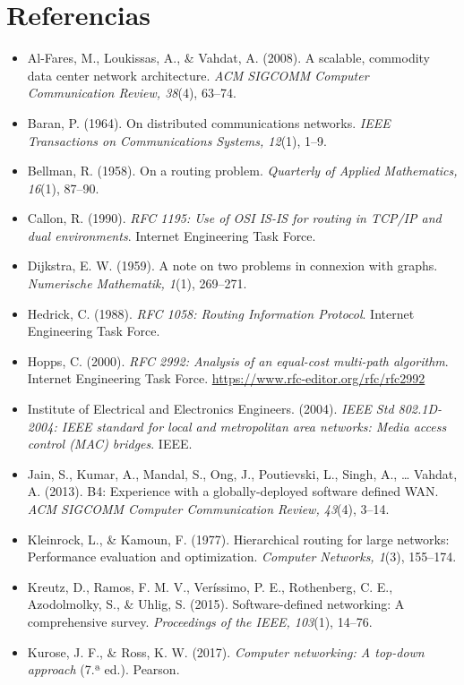 \documentclass[12pt,letterpaper]{article}
\begin{document}
\newpage
\section*{Referencias}
\begin{itemize}[leftmargin=1.5em,itemsep=7pt]
\item[] Al-Fares, M., Loukissas, A., \& Vahdat, A. (2008). A scalable, commodity data center network architecture. \emph{ACM SIGCOMM Computer Communication Review, 38}(4), 63--74.
\item[] Baran, P. (1964). On distributed communications networks. \emph{IEEE Transactions on Communications Systems, 12}(1), 1--9.
\item[] Bellman, R. (1958). On a routing problem. \emph{Quarterly of Applied Mathematics, 16}(1), 87--90.
\item[] Callon, R. (1990). \emph{RFC 1195: Use of OSI IS-IS for routing in TCP/IP and dual environments}. Internet Engineering Task Force.
\item[] Dijkstra, E. W. (1959). A note on two problems in connexion with graphs. \emph{Numerische Mathematik, 1}(1), 269--271.
\item[] Hedrick, C. (1988). \emph{RFC 1058: Routing Information Protocol}. Internet Engineering Task Force.
\item[] Hopps, C. (2000). \emph{RFC 2992: Analysis of an equal-cost multi-path algorithm}. Internet Engineering Task Force. \url{https://www.rfc-editor.org/rfc/rfc2992}
\item[] Institute of Electrical and Electronics Engineers. (2004). \emph{IEEE Std 802.1D-2004: IEEE standard for local and metropolitan area networks: Media access control (MAC) bridges}. IEEE.
\item[] Jain, S., Kumar, A., Mandal, S., Ong, J., Poutievski, L., Singh, A., \ldots{} Vahdat, A. (2013). B4: Experience with a globally-deployed software defined WAN. \emph{ACM SIGCOMM Computer Communication Review, 43}(4), 3--14.
\item[] Kleinrock, L., \& Kamoun, F. (1977). Hierarchical routing for large networks: Performance evaluation and optimization. \emph{Computer Networks, 1}(3), 155--174.
\item[] Kreutz, D., Ramos, F. M. V., Veríssimo, P. E., Rothenberg, C. E., Azodolmolky, S., \& Uhlig, S. (2015). Software-defined networking: A comprehensive survey. \emph{Proceedings of the IEEE, 103}(1), 14--76.
\item[] Kurose, J. F., \& Ross, K. W. (2017). \emph{Computer networking: A top-down approach} (7.ª ed.). Pearson.

\end{itemize}
\end{document}

